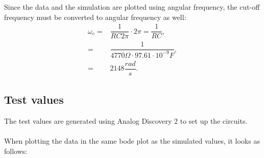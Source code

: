 \noindent Since the data and the simulation are plotted using angular frequency, the cut-off frequency must be converted to angular frequency as well:
\begin{align}
	\omega _c =& \dfrac{1}{RC2\pi} \cdot 2\pi = \dfrac{1}{RC}, \nonumber \\
			  =& \dfrac{1}{4770 \Omega \cdot 97.61 \cdot 10^{-9} F}, \nonumber \\
			  =& 2148 \dfrac{rad}{s}. \label{sim:cut}
\end{align}

\subsection{Test values}
The test values are generated using Analog Discovery 2 to set up the circuits. 
\\ \\ 
When plotting the data in the same bode plot as the simulated values, it looks as follows:
